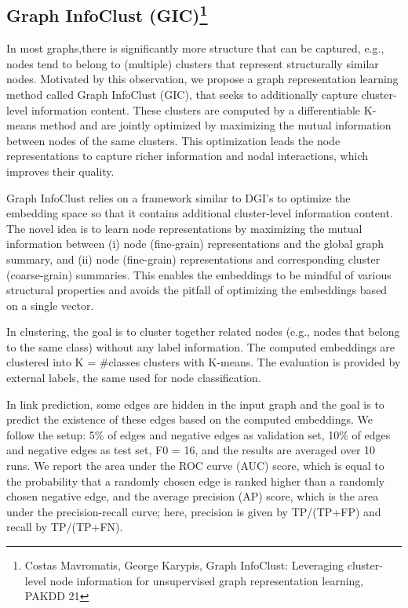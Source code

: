 \documentclass[11pt]{article}
\begin{document}
\subsection{Graph InfoClust (GIC)\footnote{Costas Mavromatis, George Karypis, Graph InfoClust: Leveraging cluster-level node information for unsupervised graph representation learning, PAKDD 21}}
In most graphs,there is significantly more structure that can be captured, e.g., nodes tend to belong to (multiple) clusters that represent structurally similar nodes. Motivated by this observation, we propose a graph representation learning method called Graph InfoClust (GIC), that seeks to additionally capture cluster-level information content. These clusters are computed by a differentiable K-means method and are jointly optimized by maximizing the mutual information between nodes of the same clusters. This optimization leads the node representations to capture richer information and nodal interactions, which improves their quality.

Graph InfoClust relies on a framework similar to DGI’s to optimize the embedding space so that it contains additional cluster-level information content. The novel idea is to learn node representations by maximizing the mutual information between (i) node (fine-grain) representations and the global graph summary, and (ii) node (fine-grain) representations and corresponding cluster (coarse-grain) summaries. This enables the embeddings to be mindful of various structural properties and avoids the pitfall of optimizing the embeddings based on a single vector.

In clustering, the goal is to cluster together related nodes (e.g., nodes that belong to the same class) without any label information. The computed embeddings are clustered into K = \#classes clusters with K-means. The evaluation is provided by external labels, the same used for node classification.

In link prediction, some edges are hidden in the input graph and the goal is to predict the existence of these edges based on the computed embeddings. We follow the setup: 5\% of edges and negative edges as validation set, 10\% of edges and negative edges as test set, F0 = 16, and the results are averaged over 10 runs. We report the area under the ROC curve (AUC) score, which is equal to the probability that a randomly chosen edge is ranked higher than a randomly chosen negative edge, and the average precision (AP) score, which is the area under the precision-recall curve; here, precision is given by TP/(TP+FP) and recall by TP/(TP+FN).
\end{document}

